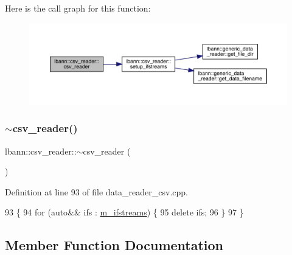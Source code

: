 Here is the call graph for this function\+:\nopagebreak
\begin{figure}[H]
\begin{center}
\leavevmode
\includegraphics[width=350pt]{classlbann_1_1csv__reader_a6482322efe56d495bcea4df65ebf381a_cgraph}
\end{center}
\end{figure}
\mbox{\label{classlbann_1_1csv__reader_aa992b822439071b8c38115726680003b}} 
\subsubsection{\texorpdfstring{$\sim$csv\+\_\+reader()}{~csv\_reader()}}
{\footnotesize\ttfamily lbann\+::csv\+\_\+reader\+::$\sim$csv\+\_\+reader (\begin{DoxyParamCaption}{ }\end{DoxyParamCaption})\hspace{0.3cm}{\ttfamily [override]}}



Definition at line 93 of file data\+\_\+reader\+\_\+csv.\+cpp.


\begin{DoxyCode}
93                         \{
94   \textcolor{keywordflow}{for} (\textcolor{keyword}{auto}&& ifs : \hyperlink{classlbann_1_1csv__reader_a41ede08dd2ed420bf8f6c6670d892caf}{m\_ifstreams}) \{
95     \textcolor{keyword}{delete} ifs;
96   \}
97 \}
\end{DoxyCode}


\subsection{Member Function Documentation}
\mbox{\label{classlbann_1_1csv__reader_a6a45ad54bb7f2b30722d70ea8921243d}} 
